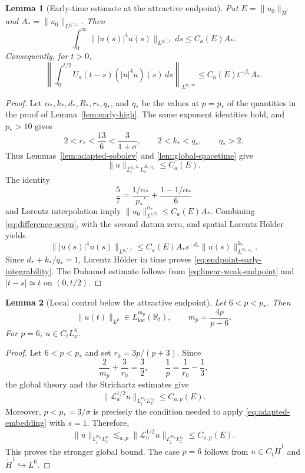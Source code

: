 \documentclass[preprint,12pt]{elsarticle}
\numberwithin{equation}{section}
\newtheorem{lemma}{Lemma}[section]
\theoremstyle{definition}
\theoremstyle{remark}
\newcommand{\R}{\mathbb R}
\newcommand{\cL}{\mathcal L}
\newcommand{\norm}[2]{\lVert #1\rVert_{#2}}
\begin{document}
\begin{lemma}[Early-time estimate at the attractive endpoint]
\label{lem:endpoint-early-high}
Put $E=\norm{u_0}{\dot H^1}$ and
$A_*=\norm{u_0}{L^{p_*',1}}$. Then
\begin{equation}
 \int_0^\infty
 \norm{|u(s)|^4u(s)}{L^{p_*',1}}\,ds
 \leq C_a(E)A_*.
 \label{eq:endpoint-early-integrability}
\end{equation}
Consequently, for $t>0$,
\[
 \left\|\int_0^{t/2}U_a(t-s)(|u|^4u)(s)\,ds
 \right\|_{L^{p_*,\infty}}
 \leq C_a(E)t^{-\beta_*}A_*.
\]
\end{lemma}

\begin{proof}
Let $\alpha_*,k_*,d_*,R_*,r_*,q_*$, and $\eta_*$ be the values at
$p=p_*$ of the quantities in the proof of Lemma~\ref{lem:early-high}.
The same exponent identities hold, and $p_*>10$ gives
\[
 2<r_*<\frac{13}{6}<\frac3{1+\sigma},
 \qquad 2<k_*<q_*,\qquad \eta_*>2.
\]
Thus Lemmas~\ref{lem:adapted-sobolev} and
\ref{lem:global-spacetime} give
\[
 \norm{u}{L_t^{q_*,k_*}L_x^{R_*,\eta_*}}
 \leq C_a(E).
\]
The identity
\[
 \frac57=\frac{1/\alpha_*}{p_*'}
 +\frac{1-1/\alpha_*}{6}
\]
and Lorentz interpolation imply
$\norm{u_0}{L^{7/5}}^{\alpha_*}\leq C_a(E)A_*$.
Combining \eqref{eq:difference-seven}, with the second datum zero,
and spatial Lorentz H\"older yields
\[
 \norm{|u(s)|^4u(s)}{L^{p_*',1}}
 \leq C_a(E)A_*s^{-d_*}
 \norm{u(s)}{L^{R_*,\eta_*}}^{k_*}.
\]
Since $d_*+k_*/q_*=1$, Lorentz H\"older in time proves
\eqref{eq:endpoint-early-integrability}. The Duhamel estimate follows
from \eqref{eq:linear-weak-endpoint} and $|t-s|\simeq t$ on $(0,t/2)$.
\end{proof}

\begin{lemma}[Local control below the attractive endpoint]
\label{lem:local-high}
Let $6<p<p_*$. Then
\[
 \norm{u(t)}{L^p}\in L_{\mathrm{loc}}^{m_p}(\R_t),
 \qquad m_p=\frac{4p}{p-6}.
\]
For $p=6$, $u\in C_tL_x^6$.
\end{lemma}



\begin{proof}
	Let $6<p<p_*$ and set $r_0=3p/(p+3)$.  Since
	\[
	\frac2{m_p}+\frac3{r_0}=\frac32,
	\qquad
	\frac1p=\frac1{r_0}-\frac13,
	\]
	the global theory \cite[Theorem~1.2]{KillipNLS} and the Strichartz
	estimates \cite{BurqEtAl} give
	\[
	\norm{\cL_a^{1/2}u}{L_t^{m_p}L_x^{r_0}}\leq C_{a,p}(E).
	\]
	Moreover, $p<p_*=3/\sigma$ is precisely the condition needed to apply
	\eqref{eq:adapted-embedding} with $s=1$.  Therefore,
	\[
	\norm{u}{L_t^{m_p}L_x^p}
	\lesssim_{a,p}
	\norm{\cL_a^{1/2}u}{L_t^{m_p}L_x^{r_0}}
	\leq C_{a,p}(E).
	\]
	This proves the stronger global bound.  The case $p=6$ follows from
	$u\in C_t\dot H^1$ and $\dot H^1\hookrightarrow L^6$.
\end{proof}
\end{document}
